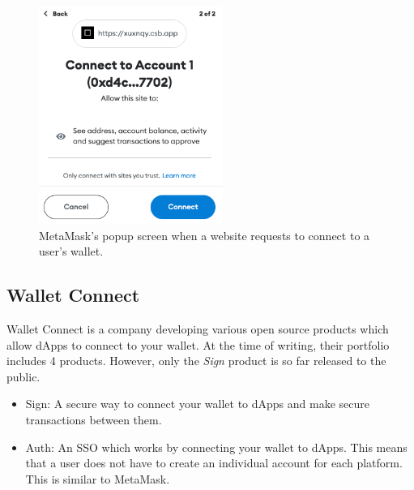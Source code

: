 \begin{figure}[t]
\includegraphics[width=6cm]{./gfx/metamaskPopup.png}
\centering
\caption{MetaMask's popup screen when a website requests to connect to a user's wallet.}
\label{fig:metamaskPopup}
\end{figure}


\subsection{Wallet Connect}
\label{sec:sota:walletConnect}
Wallet Connect \cite{walletConnect} is a company developing various open source products which allow dApps to connect to your wallet. At the time of writing, their portfolio includes 4 products. However, only the \textit{Sign} product is so far released to the public.

\begin{itemize}
	\item Sign: A secure way to connect your wallet to dApps and make secure transactions between them. \cite{walletConnect}
	\item Auth: An SSO which works by connecting your wallet to dApps. This means that a user does not have to create an individual account for each platform. This is similar to MetaMask. \cite{walletConnect}
\end{itemize}
